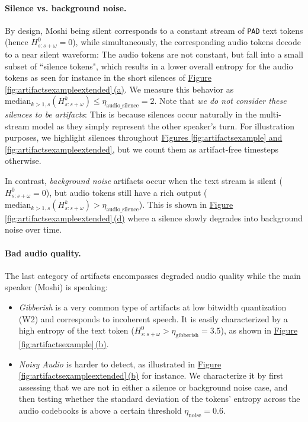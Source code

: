 \paragraph{Silence vs. background noise.} 
By design, Moshi being silent corresponds to a constant stream of \texttt{PAD} text tokens (hence $H^0_{s:s+\omega} = 0$), while simultaneously, the corresponding audio tokens decode to a near silent waveform: The audio tokens are not constant, but fall into a small subset of ``silence tokens", which results in a  lower overall entropy for the audio tokens as seen for instance in the short silences of \hyperref[fig:artifactsexampleextended]{Figure \ref{fig:artifactsexampleextended}\,(a)}. We measure this behavior as  $\text{median}_{k > 1, s}(H^k_{s:s+\omega}) \leq \eta_{\text{audio\_silence}} = 2 $.
Note that \textit{we do not consider these silences to be artifacts}: This is because silences occur naturally in the multi-stream model as they simply represent the other speaker's turn. For illustration purposes, we highlight silences throughout \hyperref[fig:artifactsexampleextended]{Figures \ref{fig:artifactsexample} and \ref{fig:artifactsexampleextended}}, but we  count them as artifact-free timesteps otherwise.

In contrast, \emph{background noise} artifacts occur when the text stream is silent ($H^0_{s:s+\omega} = 0$), but audio tokens still have a rich output  ($\text{median}_{k > 1, s}(H^k_{s:s+\omega}) > \eta_{\text{audio\_silence}} $). This is shown in \hyperref[fig:artifactsexampleextended]{Figure \ref{fig:artifactsexampleextended}\,(d)} where a silence slowly degrades into background noise over time. 
\paragraph{Bad audio quality.} The last category of artifacts encompasses degraded audio quality while the main speaker (Moshi) is speaking: 
\begin{itemize}
\item \emph{Gibberish} is a very common type of artifacts at low bitwidth quantization (W2) and corresponds to incoherent speech. It is easily characterized by a high entropy of the text token ($H^0_{s:s+\omega} > \eta_{\text{gibberish}} = 3.5 $), as shown in \hyperref[fig:artifactsexample]{Figure \ref{fig:artifactsexample}\,(b)}.

\item \emph{Noisy Audio} is harder to detect, as illustrated in \hyperref[fig:artifactsexampleextended]{Figure \ref{fig:artifactsexampleextended}\,(b)} for instance.
We characterize it by first assessing that we are not in either a silence or background noise case, and then testing whether the standard deviation of the tokens' entropy across the audio codebooks is above a certain threshold $\eta_\text{noise} = 0.6$. 
\end{itemize}

